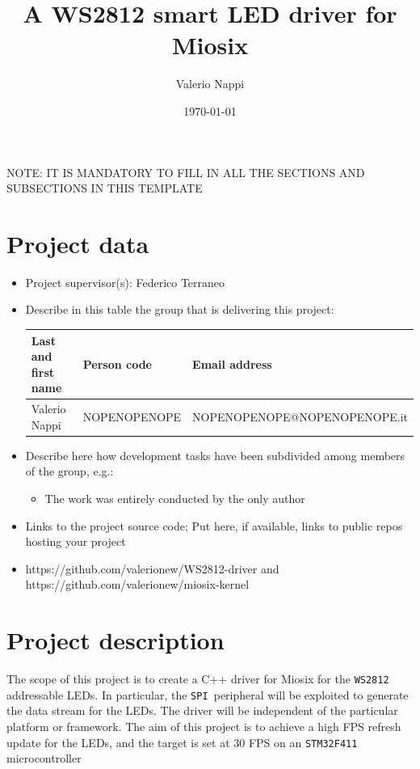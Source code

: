 \documentclass[10pt,a4]{article}
\author{Valerio Nappi}
\date{\today}
\title{A WS2812 smart LED driver for Miosix}
\newcommand{\stm}{\texttt{STM32F411 }}
\newcommand{\ws}{\texttt{WS2812 }}
\newcommand{\spi}{\texttt{SPI }}
\begin{document}
\maketitle
\tableofcontents

\begin{center}
NOTE: IT IS MANDATORY TO FILL IN ALL THE SECTIONS AND SUBSECTIONS IN THIS TEMPLATE
\end{center}

\section{Project data}

\begin{itemize}
\item 
  Project supervisor(s): Federico Terraneo

\item 
Describe in this table the group that is delivering this project:

\begin{center}
\begin{tabular}{lll}
Last and first name & Person code & Email address\\
\hline
  Valerio Nappi & NOPENOPENOPE & NOPENOPENOPE@NOPENOPENOPE.it
\end{tabular}
\end{center}

\item
Describe here how development tasks have been subdivided among members
of the group, e.g.:

\begin{itemize}
\item The work was entirely conducted by the only author
\end{itemize}

\item Links to the project source code; Put here, if available, links to public repos hosting your project 
\item https://github.com/valerionew/WS2812-driver and https://github.com/valerionew/miosix-kernel

\end{itemize}


\section{Project description}
The scope of this project is to create a C++ driver for Miosix for the \ws addressable LEDs. In particular, the \spi peripheral will be exploited to generate the data stream for the LEDs. The driver will be independent of the particular platform or framework. The aim of this project is to achieve a high FPS refresh update for the LEDs, and the target is set at 30 FPS on an \stm microcontroller
\end{document}

